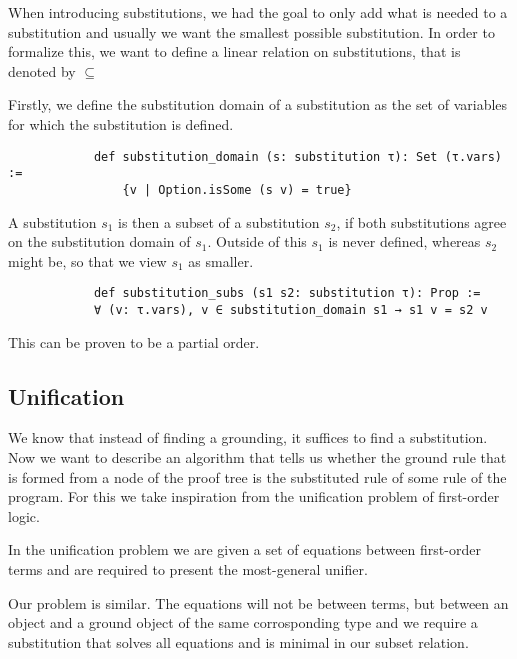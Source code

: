 \documentclass{article}
\begin{document}
            When introducing substitutions, we had the goal to only add what is needed to a substitution and usually we want the smallest possible substitution. In order to formalize this, we want to define a linear relation on substitutions, that is denoted by $\subseteq$

            Firstly, we define the substitution domain of a substitution as the set of variables for which the substitution is defined. 

            \begin{lstlisting}
            def substitution_domain (s: substitution τ): Set (τ.vars) := 
                {v | Option.isSome (s v) = true}
            \end{lstlisting}

            A substitution $s_1$ is then a subset of a substitution $s_2$, if both substitutions agree on the substitution domain of $s_1$. Outside of this $s_1$ is never defined, whereas $s_2$ might be, so that we view $s_1$ as smaller.

            \begin{lstlisting}
            def substitution_subs (s1 s2: substitution τ): Prop :=
            ∀ (v: τ.vars), v ∈ substitution_domain s1 → s1 v = s2 v
            \end{lstlisting}

            This can be proven to be a partial order.

        \subsection{Unification}

        We know that instead of finding a grounding, it suffices to find a substitution. Now we want to describe an algorithm that tells us whether the ground rule that is formed from a node of the proof tree is the substituted rule of some rule of the program. For this we take inspiration from the unification problem of first-order logic.

        In the unification problem we are given a set of equations between first-order terms and are required to present the most-general unifier.

        Our problem is similar. The equations will not be between terms, but between an object and a ground object of the same corrosponding type and we require a substitution that solves all equations and is minimal in our subset relation.
\end{document}
